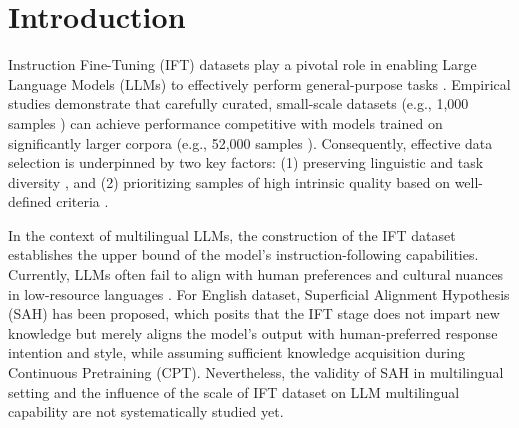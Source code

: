 \documentclass[sigconf]{acmart}
\begin{document}



\maketitle

\section{Introduction}
\label{sec:intro}

Instruction Fine-Tuning (IFT) datasets play a pivotal role in enabling Large Language Models (LLMs) to effectively perform general-purpose tasks \cite{alpaca,dolly_15k,vicuna2023}. Empirical studies demonstrate that carefully curated, small-scale datasets (e.g., 1,000 samples \cite{LIMA}) can achieve performance competitive with models trained on significantly larger corpora (e.g., 52,000 samples \cite{alpaca}). Consequently, effective data selection is underpinned by two key factors: (1) preserving linguistic and task diversity \cite{super_natural_instructions,active_instruction_tuning}, and (2) prioritizing samples of high intrinsic quality based on well-defined criteria \cite{from_quantity_to_quality,llm_perplexity_estimation}.

In the context of multilingual LLMs, the construction of the IFT dataset establishes the upper bound of the model's instruction-following capabilities. Currently, LLMs often fail to align with human preferences and cultural nuances in low-resource languages \cite{xllama_100}. For English dataset, Superficial Alignment Hypothesis (SAH) \cite{LIMA} has been proposed, which posits that the IFT stage does not impart new knowledge but merely aligns the model's output with human-preferred response intention and style, while assuming sufficient knowledge acquisition during Continuous Pretraining (CPT). Nevertheless, the validity of SAH in multilingual setting and the influence of the scale of IFT dataset on LLM multilingual capability are not systematically studied yet.
\end{document}
